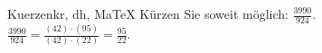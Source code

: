 \begin{MAufgabe}{Kuerzen}{kr, dh, MaTeX}
K\"urzen Sie soweit m\"oglich: $\frac{3990}{924}$.\\ 
\ifLsg\MLoesung
\quad $\frac{3990}{924}=\frac{(42)\cdot(95)}{(42)\cdot(22)}=\frac{95}{22}$.\else\relax\fi
 \end{MAufgabe}